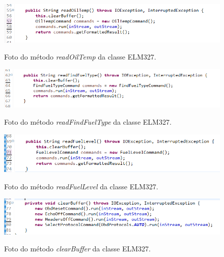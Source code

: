 \begin{figure}[!ht]
\centering
\caption{Foto do método \textit{readOilTemp} da classe ELM327.} 
{\includegraphics[scale=.85]{imagens/pacoteScanner-ELM327_readOilTemp.png}}\\
 \label{Fig:elm327_read_oil_temp}
\end{figure}

\begin{figure}[!ht]
\centering
\caption{Foto do método \textit{readFindFuelType} da classe ELM327.} 
{\includegraphics[scale=.80]{imagens/pacoteScanner-ELM327_readFindFuelType.png}}\\
 \label{Fig:elm327_read_find_fuel_type}
\end{figure}

\begin{figure}[!ht]
\centering
\caption{Foto do método \textit{readFuelLevel} da classe ELM327.} 
{\includegraphics[scale=.70]{imagens/pacoteScanner-ELM327_readFuelLevel.png}}\\
 \label{Fig:elm327_read_fuel_level}
\end{figure}

\begin{figure}[!ht]
\centering
\caption{Foto do método \textit{clearBuffer} da classe ELM327.} 
{\includegraphics[scale=.70]{imagens/pacoteScanner-ELM327_clearBuffer.png}}\\
 \label{Fig:elm327_clear_buffer}
\end{figure}

